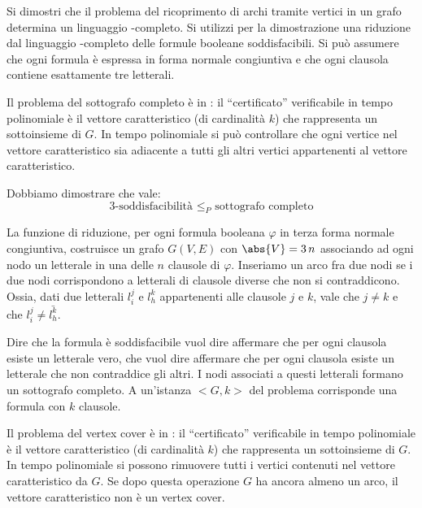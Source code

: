 
\usepackage{algorithm}
\usepackage{algpseudocode}



\setcounter{chapter}{1}
\setcounter{section}{1}

\begin{esercizio}
Si dimostri che il problema del ricoprimento di archi tramite vertici in un grafo determina un linguaggio -completo. Si utilizzi per la dimostrazione una riduzione dal linguaggio -completo delle formule booleane soddisfacibili. Si può assumere che ogni formula è espressa in forma normale congiuntiva e che ogni clausola contiene esattamente tre letterali.
\end{esercizio}

Il problema del sottografo completo \`e in : il ``certificato'' verificabile in tempo polinomiale \`e il vettore caratteristico (di cardinalit\`a $k$) che rappresenta un sottoinsieme di $G$. In tempo polinomiale si pu\`o controllare che ogni vertice nel vettore caratteristico sia adiacente a tutti gli altri vertici appartenenti al vettore caratteristico.

Dobbiamo dimostrare che vale:
\[
\text{3-soddisfacibilit\`a } \le_P \text{ sottografo completo}
\]

La funzione di riduzione, per ogni formula booleana $\varphi$ in terza forma normale congiuntiva, costruisce un grafo $G(V,E)$ con $\abs{V} = 3 \, n$ associando ad ogni nodo un letterale in una delle $n$ clausole di $\varphi$. Inseriamo un arco fra due nodi se i due nodi corrispondono a letterali di clausole diverse che non si contraddicono. Ossia, dati due letterali $l_i^j$ e $l_h^k$ appartenenti alle clausole $j$ e $k$, vale che $j \neq k$ e che $l_i^j \neq \bar{l_h^k}$.

Dire che la formula \`e soddisfacibile vuol dire affermare che per ogni clausola esiste un letterale vero, che vuol dire affermare che per ogni clausola esiste un letterale che non contraddice gli altri. I nodi associati a questi letterali formano un sottografo completo. A un'istanza $<G,k>$ del problema corrisponde una formula con $k$ clausole.
 
Il problema del vertex cover \`e in : il ``certificato'' verificabile in tempo polinomiale \`e il vettore caratteristico (di cardinalit\`a $k$) che rappresenta un sottoinsieme di $G$. In tempo polinomiale si possono rimuovere tutti i vertici contenuti nel vettore caratteristico da $G$. Se dopo questa operazione $G$ ha ancora almeno un arco, il vettore caratteristico non \`e un vertex cover.

